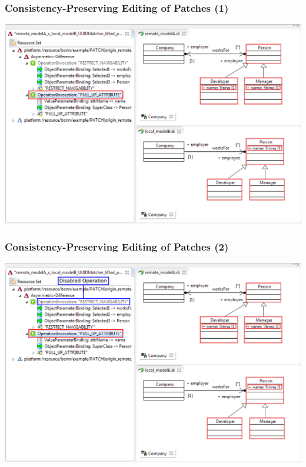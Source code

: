 \begin{frame}
  \frametitle{Consistency-Preserving Editing of Patches (1)}
  \begin{center}
  \includegraphics[scale=0.425]{images/asymmetric_pull_up_attribute_1}
  \end{center}
\end{frame}
\begin{frame}[noframenumbering]
  \frametitle{Consistency-Preserving Editing of Patches (2)}
  \begin{center}
  \includegraphics[scale=0.425]{images/asymmetric_pull_up_attribute_2}
  \end{center}
\end{frame}
